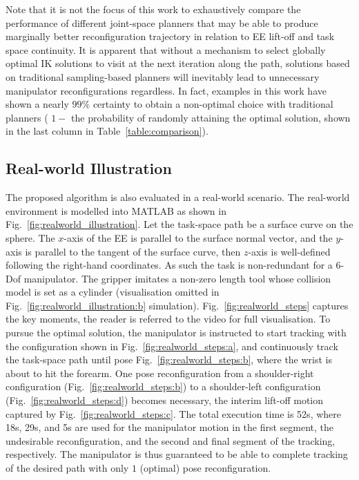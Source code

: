\documentclass[letterpaper, 10 pt, journal, twoside]{ieeetran}  %
\begin{document}
Note that it is not the focus of this work to exhaustively compare the performance of different joint-space planners that may be able to produce marginally better reconfiguration trajectory in relation to EE lift-off and task space continuity. It is apparent that without a mechanism to select globally optimal IK solutions to visit at the next iteration along the path, solutions based on traditional sampling-based planners will inevitably lead to unnecessary manipulator reconfigurations regardless. In fact, examples in this work have shown a nearly $99\%$ certainty to obtain a non-optimal choice with traditional planners ( $1 - $ the probability of randomly attaining the optimal solution, shown in the last column in Table~\ref{table:comparison}).


\subsection{Real-world Illustration}\label{section:realworld}
The proposed algorithm is also evaluated in a real-world scenario. 
The real-world environment is modelled into MATLAB as shown in Fig.~\ref{fig:realworld_illustration}. Let the task-space path be a surface curve on the sphere. 
The $x$-axis of the EE is parallel to the surface normal vector, and the $y$-axis is parallel to the tangent of the surface curve, then $z$-axis is well-defined following the right-hand coordinates. As such the task is non-redundant for a $6$-Dof manipulator. The gripper imitates a non-zero length tool whose collision model is set as a cylinder (visualisation omitted in Fig.~\ref{fig:realworld_illustration:b} simulation). 
Fig.~\ref{fig:realworld_steps} captures the key moments, the reader is referred to the video for full visualisation. 
To pursue the optimal solution, the manipulator is instructed %
to start tracking with the configuration shown in Fig.~\ref{fig:realworld_steps:a}, and continuously track the task-space path until pose Fig.~\ref{fig:realworld_steps:b}, where the wrist is about to hit the forearm. 
One pose reconfiguration from a shoulder-right configuration (Fig.~\ref{fig:realworld_steps:b}) to a shoulder-left configuration (Fig.~\ref{fig:realworld_steps:d}) becomes necessary, the interim lift-off motion captured by Fig.~\ref{fig:realworld_steps:c}. 
The total execution time is 52s, where 18s, 29s, and 5s are used for the manipulator motion in the first segment, the undesirable reconfiguration, and the second and final segment of the tracking, respectively. 
The manipulator is thus guaranteed to be able to complete tracking of the desired path with only $1$ (optimal) pose reconfiguration. 
\end{document}
